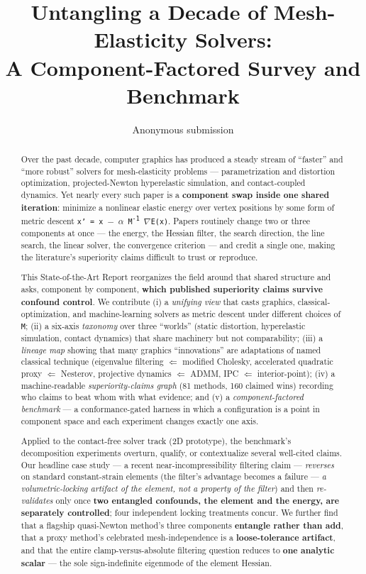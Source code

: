 \documentclass{egpubl}
\title[Untangling a Decade of Mesh-Elasticity Solvers]%
      {Untangling a Decade of Mesh-Elasticity Solvers:\\ A Component-Factored Survey and Benchmark}
\author[Anonymous]{Anonymous submission}
\begin{document}
\maketitle
\begin{abstract}
Over the past decade, computer graphics has produced a steady stream of ``faster'' and ``more robust''
solvers for mesh-elasticity problems --- parametrization and distortion optimization, projected-Newton
hyperelastic simulation, and contact-coupled dynamics. Yet nearly every such paper is a \textbf{component
swap inside one shared iteration}: minimize a nonlinear elastic energy over vertex positions by some
form of metric descent \texttt{x' = x $-$ $\alpha$ M\textsuperscript{-1} $\nabla$E(x)}. Papers routinely change two or three components at
once --- the energy, the Hessian filter, the search direction, the line search, the linear solver, the
convergence criterion --- and credit a single one, making the literature's superiority claims difficult
to trust or reproduce.

This State-of-the-Art Report reorganizes the field around that shared structure and asks, component
by component, \textbf{which published superiority claims survive confound control}. We contribute (i) a
\emph{unifying view} that casts graphics, classical-optimization, and machine-learning solvers as metric
descent under different choices of \texttt{M}; (ii) a six-axis \emph{taxonomy} over three ``worlds'' (static
distortion, hyperelastic simulation, contact dynamics) that share machinery but not comparability;
(iii) a \emph{lineage map} showing that many graphics ``innovations'' are adaptations of named classical
technique (eigenvalue filtering $\Leftarrow$ modified Cholesky, accelerated quadratic proxy $\Leftarrow$ Nesterov,
projective dynamics $\Leftarrow$ ADMM, IPC $\Leftarrow$ interior-point); (iv) a machine-readable \emph{superiority-claims graph}
(81 methods, 160 claimed wins) recording who claims to beat whom with what evidence; and (v) a
\emph{component-factored benchmark} --- a conformance-gated harness in which a configuration is a point in
component space and each experiment changes exactly one axis.

Applied to the contact-free solver track (2D prototype), the benchmark's decomposition experiments
overturn, qualify, or contextualize several well-cited claims. Our headline case study --- a recent
near-incompressibility filtering claim --- \emph{reverses} on standard constant-strain elements (the
filter's advantage becomes a failure --- \emph{a volumetric-locking artifact of the element, not a property
of the filter}) and then \emph{re-validates} only once \textbf{two entangled confounds, the element and the
energy, are separately controlled}; four independent locking treatments concur.
We further find that a flagship quasi-Newton method's three components \textbf{entangle rather than add},
that a proxy method's celebrated mesh-independence is a \textbf{loose-tolerance artifact}, and that the
entire clamp-versus-absolute filtering question reduces to \textbf{one analytic scalar} --- the sole
sign-indefinite eigenmode of the element Hessian.


\end{abstract}
\end{document}
